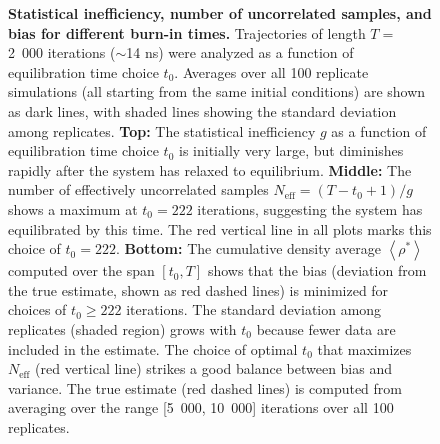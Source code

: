 \documentclass[aps,pre,twocolumn,nofootinbib,superscriptaddress,linenumbers,11point]{revtex4-1}
\begin{document}

\begin{figure} 
\caption{\label{figure:reverse-cumulative-average} {\bf Statistical inefficiency, number of uncorrelated samples, and bias for different burn-in times.} 
Trajectories of length $T = $ 2~000 iterations ($\sim$14 ns) were analyzed as a function of equilibration time choice $t_0$.
Averages over all 100 replicate simulations (all starting from the same initial conditions) are shown as dark lines, with shaded lines showing the standard deviation among replicates.
{\bf Top:} The statistical inefficiency $g$ as a function of equilibration time choice $t_0$ is initially very large, but diminishes rapidly after the system has relaxed to equilibrium.
{\bf Middle:} The number of effectively uncorrelated samples $N_\mathrm{eff} = (T - t_0 + 1) / g$ shows a maximum at $t_0 = 222$ iterations, suggesting the system has equilibrated by this time.
The red vertical line in all plots marks this choice of $t_0 = 222$.
{\bf Bottom:} The cumulative density average $\left\langle \rho^* \right\rangle$ computed over the span $[t_0, T]$ shows that the bias (deviation from the true estimate, shown as red dashed lines) is minimized for choices of $t_0 \ge 222$ iterations.
The standard deviation among replicates (shaded region) grows with $t_0$ because fewer data are included in the estimate.
The choice of optimal $t_0$ that maximizes $N_\mathrm{eff}$ (red vertical line) strikes a good balance between bias and variance.
The true estimate (red dashed lines) is computed from averaging over the range [5~000, 10~000] iterations over all 100 replicates.
}
\end{figure}
\end{document}
